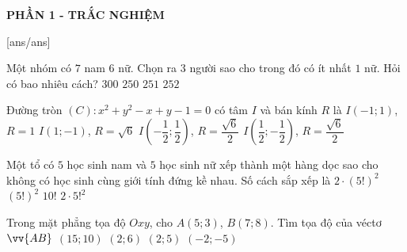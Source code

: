 
\begin{center}
	\textbf{PHẦN 1 - TRẮC NGHIỆM}
\end{center}
[ans/ans]
\begin{ex}%
	Một nhóm có $7$ nam $6$ nữ. Chọn ra $3$ người sao cho trong đó có ít nhất $1$ nữ. Hỏi có bao nhiêu cách?
	\choice
	{$300$}
	{$250$}
	{\True $251$}
	{$252$}
\end{ex}
\begin{ex}%
	Đường tròn $(C)\colon x^2+y^2-x+y-1=0$ có tâm $I$ và bán kính $R$ là
	\choice
	{$I(-1;1)$, $R=1$}
	{$I(1;-1)$, $R=\sqrt{6}$}
	{$I\left(-\dfrac{1}{2};\dfrac{1}{2}\right)$, $R =\dfrac{\sqrt{6}}{2}$}
	{\True $I\left(\dfrac{1}{2};-\dfrac{1}{2}\right)$, $R =\dfrac{\sqrt{6}}{2}$}
\end{ex}
\begin{ex}%
	Một tổ có $5$ học sinh nam và $5$ học sinh nữ xếp thành một hàng dọc sao cho không có học sinh cùng giới tính đứng kề nhau. Số cách sắp xếp là
	\choice
	{\True $2\cdot(5!)^2$}
	{$(5!)^2$}
	{$10!$}
	{$2\cdot 5!^2$}
\end{ex}
\begin{ex}%
	Trong mặt phẳng tọa độ $Oxy$, cho $A(5;3)$, $B(7;8)$. Tìm tọa độ của véctơ $\vv{AB}$
	\choice
	{$(15;10)$}
	{$(2;6)$}
	{\True $(2;5)$}
	{$(-2;-5)$}
\end{ex}
